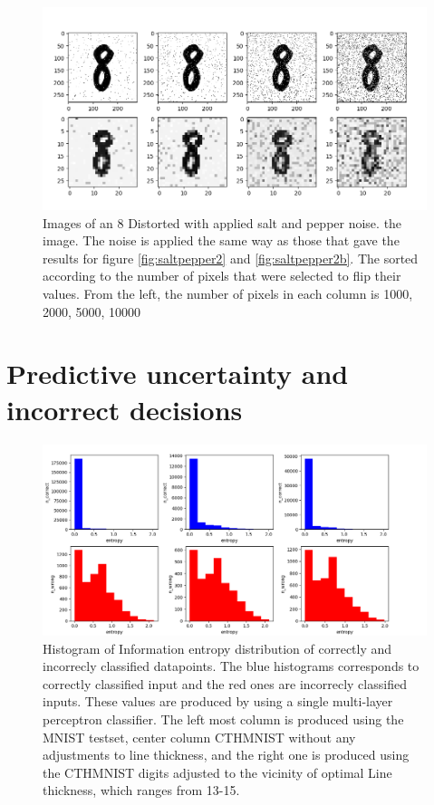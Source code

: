 \begin{figure}
    \centering
    \includegraphics[scale=0.5]{figure/digitsSaltnpepper2.png}
    \caption{Images of an 8 Distorted with applied salt and pepper noise. the image. The noise is applied the same way as those that gave the results for figure \ref{fig:saltpepper2} and \ref{fig:saltpepper2b}. The sorted according to the number of pixels that were selected to flip their values. From the left, the number of pixels in each column is 1000, 2000, 5000, 10000}
    \label{fig:digitssaltandpepper}
\end{figure}

\section{Predictive uncertainty and incorrect decisions}

\begin{figure}
    \centering
    \includegraphics[scale = 0.53]{figure/EntropyFrekIndividual.png}
    \caption{Histogram of Information entropy distribution of correctly and incorrecly classified datapoints. The blue histograms corresponds to correctly classified input and the red ones are incorrecly classified inputs. These values are produced by using a single multi-layer perceptron classifier. The left most column is produced using the MNIST testset, center column CTHMNIST without any adjustments to line thickness, and the right one is produced using the CTHMNIST digits adjusted to the vicinity of optimal Line thickness, which ranges from 13-15.}
    \label{fig:hist1mlp}
\end{figure}

